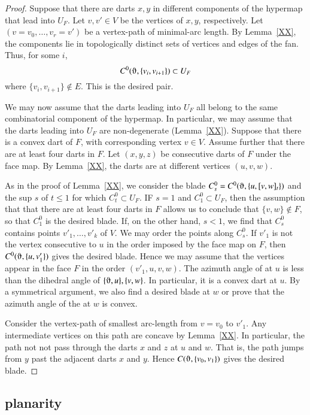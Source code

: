 \begin{proof} Suppose that there are darts $x,y$ in different components
of the hypermap that lead into $U_F$.  Let $v,v'\in V$ be the vertices of $x,y$, respectively.
Let $(v=v_0,\ldots,v_r=v')$ be a vertex-path of minimal-arc length.
By Lemma~\ref{XX},  the components
lie in topologically distinct sets of vertices and edges of the fan.   
Thus, for some $i$,
   $$
   C^0(\orgn,\{v_i,v_{i+1}\})\subset U_F
   $$
where $\{v_i,v_{i+1}\}\not\in E$.  This is the desired pair.

We may now assume that the darts leading into $U_F$ all belong to the same
combinatorial component of the hypermap.  In particular, we may assume that
the darts leading into $U_F$ are non-degenerate (Lemma~\ref{XX}).
Suppose that there is a convex  dart of $F$, with corresponding vertex $v\in V$.
Assume further that there are at least four darts in $F$.
Let $(x,y,z)$ be consecutive darts of $F$ under the face map.  By Lemma~\ref{XX},
the darts are at different vertices $(u,v,w)$.  


As in the proof of 
Lemma~\ref{XX}, we consider the blade $C^0_s= C^0(\orgn,\{u,[v,w]_t\})$ and the
sup $s$ of $t\le 1$ for which $C^0_t\subset U_F$.  IF $s=1$ and $C^0_1\subset U_F$,
then the assumption that that there are at least four darts in $F$ allows us
to conclude that $\{v,w\}\not\in F$, so that $C^0_1$ is the desired blade.
If, on the other hand, $s<1$, we find that $C^0_s$ contains points
$v'_1,\ldots,v'_k$ of $V$.  We may order the points along $C^0_s$.  If
$v'_1$ is not the vertex consecutive to $u$ in the order imposed by the face map on $F$,
then $C^0(\orgn,\{u,v'_1\})$ gives the desired blade.  Hence we may assume that
the vertices appear in the face $F$ in the order $(v'_1,u,v,w)$.  The azimuth
angle of at $u$ is less than the dihedral angle of $\{\orgn,u\},\{v,w\}$.  In particular,
it is a convex dart at $u$.  By a symmetrical argument, we also find a desired blade at $w$
or prove that the azimuth angle of the at $w$ is convex.  

Consider the vertex-path of smallest arc-length from $v=v_0$ to $v'_1$.  Any intermediate
vertices on this path are concave by Lemma~\ref{XX}.  In particular, the path
not not pass through the darts $x$ and $z$ at $u$ and $w$.  That is, the path
jumps from $y$ past the adjacent darts $x$ and $y$.  Hence 
$C(\orgn,\{v_0,v_1\})$ gives the desired blade.
\end{proof}



\subsection{planarity}



